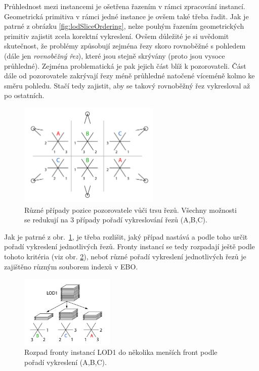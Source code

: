 Průhlednost mezi instancemi je ošetřena řazením v rámci zpracování instancí. Geometrická primitiva v rámci jedné instance je ovšem také třeba řadit. Jak je patrné z obrázku \ref{fig:lodSliceOrdering}, nelze pouhým řazením geometrických primitiv zajistit zcela korektní vykreslení. Ovšem důležité je si uvědomit skutečnost, že problémy způsobují zejména řezy skoro rovnoběžné s pohledem (dále jen \emph{rovnoběžný řez}), které jsou stejně skrývány (proto jsou vysoce průhledné). Zejména problematická je pak jejich část blíž k pozorovateli. Část dále od pozorovatele zakrývají řezy méně průhledné natočené víceméně kolmo ke směru pohledu. Stačí tedy zajistit, aby se takový rovnoběžný řez vykresloval až po ostatních.
\begin{figure}[!hbt]
\begin{center}
\includegraphics[width=0.6\textwidth]{./figures/LODtypes.png}
\end{center}
\caption[Variace pořadí vykreslování trsu řezů]%
{Různé případy pozice pozorovatele vůči trsu řezů. Všechny možnosti se redukují na 3 případy pořadí vykreslování řezů (A,B,C).
\label{fig:LODtypes}
}
\end{figure}
Jak je patrné z obr.~\ref{fig:LODtypes}, je třeba rozlišit, jaký případ nastává a podle toho určit pořadí vykreslení jednotlivých řezů. Fronty instancí se tedy rozpadají ještě podle tohoto kritéria (viz obr. \ref{fig:LODqueues}), neboť různé pořadí vykreslení jednotlivých řezů je zajištěno různým souborem indexů v EBO.
\begin{figure}[!hbt]
\begin{center}
\includegraphics[width=0.4\textwidth]{./figures/renderQueuesB.png}
\end{center}
\caption[Pořadí vykreslování LOD1]%
{Rozpad fronty instancí LOD1 do několika menších front podle pořadí vykreslení (A,B,C).
\label{fig:LODqueues}
}
\end{figure}

